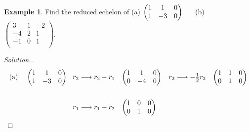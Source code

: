 \documentclass[11pt,a4paper]{article}
\theoremstyle{definition}
\newtheorem{exa}[thm]{Example}
\newenvironment{solution}
  {\renewcommand{\qedsymbol}{}\begin{proof}[\textit{Solution}.]}
  {\end{proof}}
\begin{document}
\begin{exa}
Find the reduced echelon of\hspace{0.5cm} (a) $
\begin{pmatrix}
1&1&0\\1&-3&0\\
\end{pmatrix}
\hspace{0.5cm}$ (b) 
$
\begin{pmatrix}
3&1&-2\\-4&2&1\\-1&0&1\\
\end{pmatrix}
$.
\end{exa}
\begin{solution}
\begin{align*}
\text{(a)}\hspace{0.4cm}
\begin{pmatrix}
1&1&0\\1&-3&0\\
\end{pmatrix}
&
\hspace{0.3cm}
\begin{matrix}
r_2\longrightarrow r_2-r_1\\
\end{matrix}
\hspace{0.3cm}
\begin{pmatrix}
1&1&0\\0&-4&0\\
\end{pmatrix}
\hspace{0.3cm}
\begin{matrix}
r_2\longrightarrow-\frac{1}{2}r_2\\
\end{matrix}
\hspace{0.3cm}
\begin{pmatrix}
1&1&0\\0&1&0\\
\end{pmatrix}\\\\
&\hspace{0.3cm}
\begin{matrix}
r_1\longrightarrow r_1-r_2\\
\end{matrix}
\hspace{0.3cm}
\begin{pmatrix}
1&0&0\\0&1&0\\
\end{pmatrix}\\
\end{align*}


\end{solution}
\end{document}

